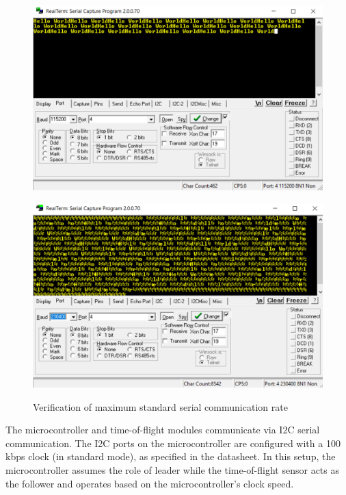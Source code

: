 \documentclass[12pt, letterpaper]{article}
\begin{document}
\begin{itemize}
\begin{figure}[htbp]
\centering
\begin{minipage}{0.48\textwidth}
\centering
\includegraphics[width=\linewidth]{rt1.png}
\label{fig:rt1}
\end{minipage}
\hfill
\begin{minipage}{0.48\textwidth}
\centering
\includegraphics[width=\linewidth]{rt2.png}
\label{fig:rt2}
\end{minipage}
\caption{Verification of maximum standard serial communication rate}
\label{fig:rt_verification}
\end{figure}
The microcontroller and time-of-flight modules communicate via I2C serial communication. The I2C ports on the microcontroller are configured with a 100 kbps clock (in standard mode), as specified in the datasheet. In this setup, the microcontroller assumes the role of leader while the time-of-flight sensor acts as the follower and operates based on the microcontroller's clock speed. 


\end{itemize}
\end{document}

